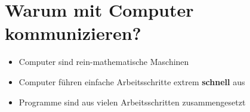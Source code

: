 
\section{Warum mit Computer kommunizieren?}
\begin{frame}
	\slidehead
	\vspace{3mm}
	\begin{itemize}
		\pause
		\item Computer sind rein-mathematische Maschinen
		\pause
		\item Computer führen einfache Arbeitsschritte extrem \textbf{schnell} aus
		\pause
		\item Programme sind aus vielen Arbeitsschritten zusammengesetzt
		\pause
	\end{itemize}
\end{frame}

